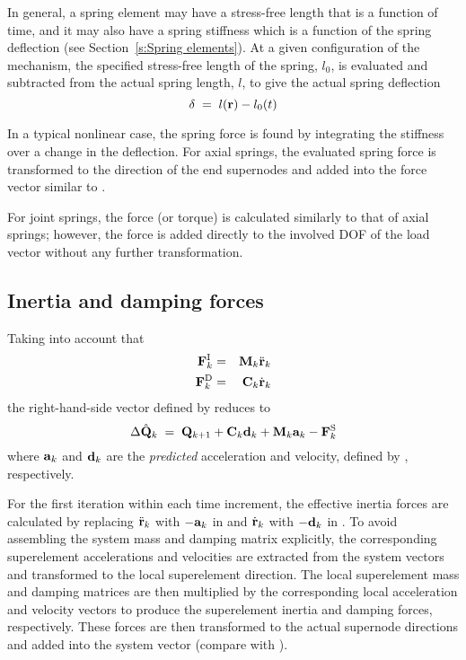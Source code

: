 In general, a spring element may have a stress-free length that is a function of
time, and it may also have a spring stiffness which is a function of the spring
deflection (see Section~\ref{s:Spring elements}).
At a given configuration of the mechanism, the specified stress-free length of
the spring, $l_0$, is evaluated and subtracted from the actual spring length,
$l$, to give the actual spring deflection
%
\begin{equation}
\delta \;=\; l({\bf r}) - l_0 (t)
\end{equation}

In a typical nonlinear case, the spring force is found by integrating the
stiffness over a change in the deflection.
For axial springs, the evaluated spring force is transformed to the direction of
the end supernodes and added into the force vector similar to
.

For joint springs, the force (or torque) is calculated similarly to that of
axial springs; however, the force is added directly to the involved DOF of the
load vector without any further transformation.

\subsection{Inertia and damping forces}

Taking into account that
%
\begin{eqnarray}
{\bf F}^{\rm I}_k &=& {\bf M}_k \ddot{\bf r}_k \label{eq:345} \\
{\bf F}^{\rm D}_k &=& {\bf C}_k  \dot{\bf r}_k \label{eq:346}
\end{eqnarray}
%
the right-hand-side vector defined by  reduces to
%
\begin{equation}
\Delta\hat\Q_k \;=\;
\Q_\kp1 + {\mf C}_k{\mf d}_k + {\mf M}_k{\mf a}_k - \Fs_k
\label{eq:347}
\end{equation}
%
where ${\bf a}_k$ and ${\bf d}_k$ are the \textit{predicted} acceleration and
velocity, defined by , respectively.

For the first iteration within each time increment, the effective inertia
forces are calculated by replacing $\ddot{\bf r}_k$ with $-{\bf a}_k$
in  and $\dot{\bf r}_k$ with $-{\bf d}_k$ in .
To avoid assembling the system mass and damping matrix explicitly,
the corresponding superelement accelerations and velocities are extracted from
the system vectors and transformed to the local superelement direction.
The local superelement mass and damping matrices are then multiplied by the
corresponding local acceleration and velocity vectors to produce the
superelement inertia and damping forces, respectively.
These forces are then transformed to the actual supernode directions and added
into the system vector (compare with ).

